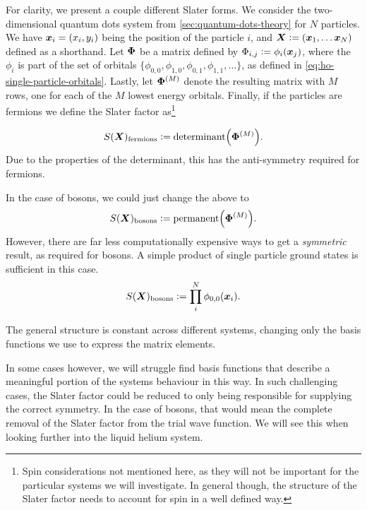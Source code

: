 \documentclass[Thesis.tex]{subfiles}
\begin{document}
For clarity, we present a couple different Slater forms. We consider the two-dimensional
quantum dots system from \cref{sec:quantum-dots-theory} for $N$ particles.  We have
$\bm{x}_i=(x_i, y_i)$ being the position of the particle $i$, and $\vb X\defeq (\vb x_1,
\dots \vb x_N)$ defined as a shorthand. Let $\bm{\Phi}$ be a matrix defined by $\Phi_{i,j}
\vcentcolon= \phi_{i}(\bm{x}_j)$, where the $\phi_i$ is part of the set of orbitals
$\{\phi_{0,0}, \phi_{1,0},\phi_{0,1}, \phi_{1,1},\dots\}$, as defined in
\cref{eq:ho-single-particle-orbitals}. Lastly, let $\bm{\Phi}^{(M)}$ denote the
resulting matrix with $M$ rows, one for each of the $M$ lowest energy orbitals. Finally,
if the particles are fermions we define the Slater factor as\footnote{Spin considerations not mentioned here, as they will not be important for the particular systems we will investigate. In general though, the structure of the Slater factor needs to account for spin in a well defined way.}

\begin{align}
    S(\bm{X})_\text{fermions} \vcentcolon= \text{determinant}\qty(\bm{\Phi}^{(M)}).
\end{align}
Due to the properties of the determinant, this has the anti-symmetry required for
fermions.

In the case of bosons, we could just change the above to
\begin{align}
    S(\bm{X})_\text{bosons} \vcentcolon= \text{permanent}\qty(\bm{\Phi}^{(M)}).
\end{align}
However, there are far less computationally expensive ways to get a \emph{symmetric}
result, as required for bosons. A simple product of single particle ground states is
sufficient in this case.
\begin{align}
    S(\bm{X})_\text{bosons} \vcentcolon= \prod_{i}^N \phi_{0,0}(\bm{x}_i).
\end{align}

The general structure is constant across different systems, changing only the basis
functions we use to express the matrix elements.

In some cases however, we will struggle find basis functions that describe a meaningful
portion of the systems behaviour in this way. In such challenging cases, the Slater factor
could be reduced to only being responsible for supplying the correct symmetry. In the case
of bosons, that would mean the complete removal of the Slater factor from the trial wave
function. We will see this when looking further into the liquid helium system.
\end{document}
